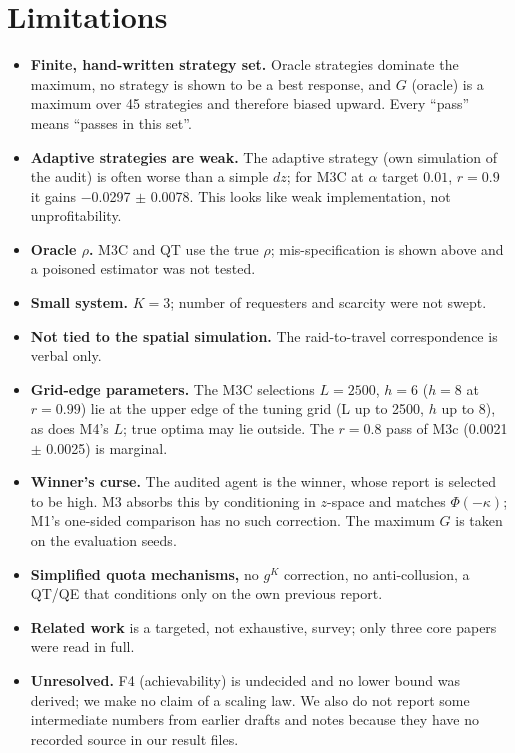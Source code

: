 \documentclass[10pt]{article}
\begin{document}
\section{Limitations}\label{sec:limits}
\begin{itemize}\setlength\itemsep{0pt}
\item \textbf{Finite, hand-written strategy set.} Oracle strategies dominate the maximum, no strategy is shown to be a best response, and $G$ (oracle) is a maximum over 45 strategies and therefore biased upward. Every ``pass'' means ``passes in this set''.
\item \textbf{Adaptive strategies are weak.} The adaptive strategy (own simulation of the audit) is often worse than a simple $dz$; for M3C at $\alpha$ target $0.01$, $r{=}0.9$ it gains $-$0.0297 $\pm$ 0.0078. This looks like weak implementation, not unprofitability.
\item \textbf{Oracle $\rho$.} M3C and QT use the true $\rho$; mis-specification is shown above and a poisoned estimator was not tested.
\item \textbf{Small system.} $K{=}3$; number of requesters and scarcity were not swept.
\item \textbf{Not tied to the spatial simulation.} The raid-to-travel correspondence is verbal only.
\item \textbf{Grid-edge parameters.} The M3C selections $L{=}2500$, $h{=}6$ ($h{=}8$ at $r{=}0.99$) lie at the upper edge of the tuning grid (L up to 2500, $h$ up to 8), as does M4's $L$; true optima may lie outside. The $r{=}0.8$ pass of M3c (0.0021 $\pm$ 0.0025) is marginal.
\item \textbf{Winner's curse.} The audited agent is the winner, whose report is selected to be high. M3 absorbs this by conditioning in $z$-space and matches $\Phi(-\kappa)$; M1's one-sided comparison has no such correction. The maximum $G$ is taken on the evaluation seeds.
\item \textbf{Simplified quota mechanisms,} no $g^K$ correction, no anti-collusion, a QT/QE that conditions only on the own previous report.
\item \textbf{Related work} is a targeted, not exhaustive, survey; only three core papers were read in full.
\item \textbf{Unresolved.} F4 (achievability) is undecided and no lower bound was derived; we make no claim of a scaling law. We also do not report some intermediate numbers from earlier drafts and notes because they have no recorded source in our result files.
\end{itemize}
\end{document}
